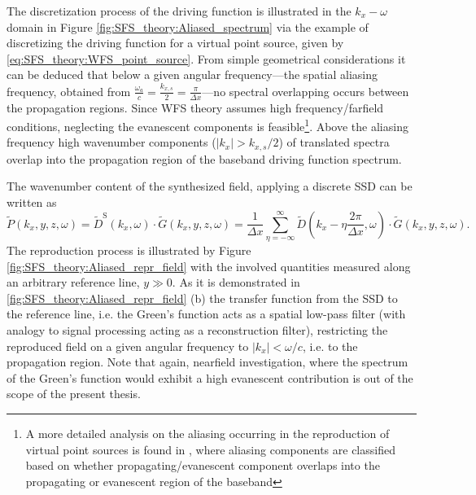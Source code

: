 The discretization process of the driving function is illustrated in the $k_x-\omega$ domain in Figure \ref{fig:SFS_theory:Aliased_spectrum} via the example of discretizing the driving function for a virtual point source, given by \eqref{eq:SFS_theory:WFS_point_source}.
From simple geometrical considerations it can be deduced that below a given angular frequency---the spatial aliasing frequency, obtained from $\frac{\omega_a }{c} = \frac{k_{x,s}}{2}= \frac{\pi}{\Delta x}$---no spectral overlapping occurs between the propagation regions.
Since WFS theory assumes high frequency/farfield conditions, neglecting the evanescent components is feasible\footnote{A more detailed analysis on the aliasing occurring in the reproduction of virtual point sources is found in \cite{spors2009spatial}, where aliasing components are classified based on whether propagating/evanescent component overlaps into the propagating or evanescent region of the baseband}. 
Above the aliasing frequency high wavenumber components ($|k_x|>k_{x,s}/2$) of translated spectra overlap into the propagation region of the baseband driving function spectrum.

The wavenumber content of the synthesized field, applying a discrete SSD can be written as
\begin{equation}
\tilde{P}(k_x,y,z, \omega) = \tilde{D}^{\mathrm{S}}(k_x,\omega) \cdot \tilde{G}(k_x,y,z, \omega) = \frac{1}{\Delta x}
\sum_{\eta = -\infty}^{\infty} \tilde{D}\left(k_x - \eta \frac{2\pi}{\Delta x},\omega \right)  \cdot \tilde{G}(k_x,y,z, \omega).
\label{Eq:SFS_theory:Aliased_field_sp}
\end{equation}
The reproduction process is illustrated by Figure \ref{fig:SFS_theory:Aliased_repr_field} with the involved quantities measured along an arbitrary reference line, $y \gg 0$.
As it is demonstrated in \ref{fig:SFS_theory:Aliased_repr_field} (b) the transfer function from the SSD to the reference line, i.e. the Green's function acts as a spatial low-pass filter (with analogy to signal processing acting as a reconstruction filter), restricting the reproduced field on a given angular frequency to $|k_x| < \omega/c$, i.e. to the propagation region.
Note that again, nearfield investigation, where the spectrum of the Green's function would exhibit a high evanescent contribution is out of the scope of the present thesis.

